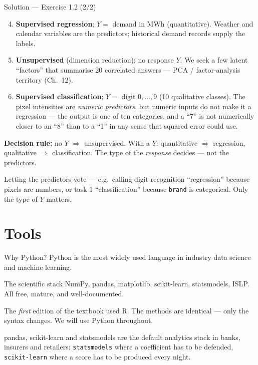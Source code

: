 \documentclass[aspectratio=169,11pt]{beamer}
\begin{document}
\begin{frame}{Solution --- Exercise 1.2 (2/2)}
\begin{solutionbox}
\begin{enumerate}\setcounter{enumi}{3}
  \item \textbf{Supervised regression}; $Y=$ demand in MWh
        (quantitative). Weather and calendar variables are the
        predictors; historical demand records supply the labels.
  \item \textbf{Unsupervised} (dimension reduction); no response $Y$.
        We seek a few latent ``factors'' that summarise 20 correlated
        answers --- PCA / factor-analysis territory (Ch.~12).
  \item \textbf{Supervised classification}; $Y=$ digit $0,\ldots,9$
        (10 qualitative classes). The pixel intensities are
        \emph{numeric predictors}, but numeric inputs do not make it a
        regression --- the output is one of ten categories, and a
        ``7'' is not numerically closer to an ``8'' than to a ``1'' in
        any sense that squared error could use.
\end{enumerate}
\textbf{Decision rule:} no $Y$ $\Rightarrow$ unsupervised. With a $Y$:
quantitative $\Rightarrow$ regression, qualitative $\Rightarrow$
classification. The type of the \emph{response} decides --- not the
predictors.
\end{solutionbox}
\begin{mistake}
Letting the predictors vote --- e.g.\ calling
digit recognition ``regression'' because pixels are numbers, or task 1
``classification'' because \texttt{brand} is categorical. Only the
type of $Y$ matters.
\end{mistake}
\end{frame}


\section{Tools}

\begin{frame}{Why Python?}
  Python is the most widely used language in industry data science
  and machine learning.
  \begin{block}{The scientific stack}
    NumPy, pandas, matplotlib, scikit-learn, statsmodels, ISLP. All
    free, mature, and well-documented.
  \end{block}
  \begin{readme}
    The \emph{first} edition of the textbook used R. The methods are
    identical --- only the syntax changes. We will use Python
    throughout.
  \end{readme}
  \begin{industry}
    pandas, scikit-learn and statsmodels are the default analytics stack in banks, insurers
    and retailers: \texttt{statsmodels} where a coefficient has to be defended,
    \texttt{scikit-learn} where a score has to be produced every night.
  \end{industry}
\end{frame}
\end{document}
